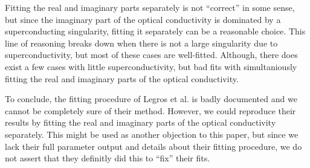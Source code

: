 Fitting the real and imaginary parts separately is not ``correct'' in some sense, but since the
imaginary part of the optical conductivity is dominated by a superconducting singularity, fitting
it separately can be a reasonable choice. This line of reasoning breaks down when there is not a
large singularity due to superconductivity, but most of these cases are well-fitted. Although, there
does exist a few cases with little superconductivity, but bad fits with simultaniously fitting the real
and imaginary parts of the optical conductivity.

To conclude, the fitting procedure of Legros et al. is badly documented and we cannot be completely
sure of their method. However, we could reproduce their results by fitting the real and imaginary
parts of the optical conductivity separately. This might be used as another objection to this paper,
but since we lack their full parameter output and details about their fitting procedure, we do not
assert that they definitly did this to ``fix'' their fits.

